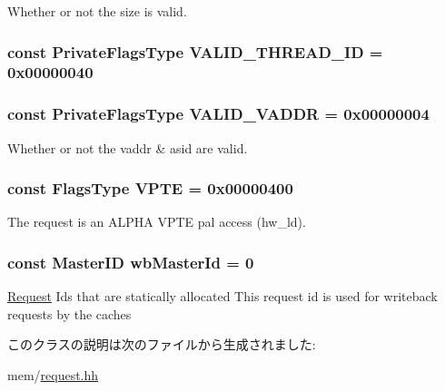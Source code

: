\label{classRequest_ab877279328c94a99e08df0bef2dff5af}
Whether or not the size is valid. \hypertarget{classRequest_a0d43d0eb62d8fc5de1f55f4912803a33}{
\subsubsection[{VALID\_\-THREAD\_\-ID}]{\setlength{\rightskip}{0pt plus 5cm}const {\bf PrivateFlagsType} {\bf VALID\_\-THREAD\_\-ID} = 0x00000040}}
\label{classRequest_a0d43d0eb62d8fc5de1f55f4912803a33}
\hypertarget{classRequest_a6df42589126b39ff720d5c4182485a1b}{
\subsubsection[{VALID\_\-VADDR}]{\setlength{\rightskip}{0pt plus 5cm}const {\bf PrivateFlagsType} {\bf VALID\_\-VADDR} = 0x00000004}}
\label{classRequest_a6df42589126b39ff720d5c4182485a1b}
Whether or not the vaddr \& asid are valid. \hypertarget{classRequest_a58cc46d2f1ce828ebbc76f065fa7fb09}{
\subsubsection[{VPTE}]{\setlength{\rightskip}{0pt plus 5cm}const {\bf FlagsType} {\bf VPTE} = 0x00000400}}
\label{classRequest_a58cc46d2f1ce828ebbc76f065fa7fb09}
The request is an ALPHA VPTE pal access (hw\_\-ld). \hypertarget{classRequest_abdfbeedab7040f62557e767ff4e79063}{
\subsubsection[{wbMasterId}]{\setlength{\rightskip}{0pt plus 5cm}const {\bf MasterID} {\bf wbMasterId} = 0}}
\label{classRequest_abdfbeedab7040f62557e767ff4e79063}
\hyperlink{classRequest}{Request} Ids that are statically allocated This request id is used for writeback requests by the caches 

このクラスの説明は次のファイルから生成されました:\begin{DoxyCompactItemize}
\item 
mem/\hyperlink{request_8hh}{request.hh}\end{DoxyCompactItemize}
